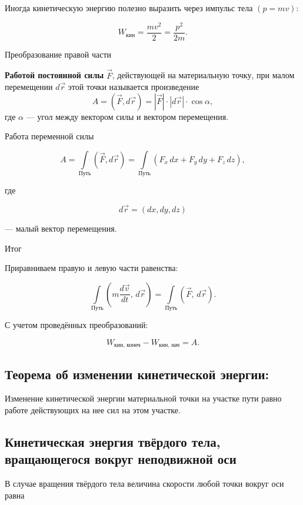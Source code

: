 \documentclass[a4paper,12pt]{article}
\begin{document}
Иногда кинетическую энергию полезно выразить через импульс тела $(p = mv)$:

\[
W_{\text{кин}}
=
\frac{mv^2}{2}
=
\frac{p^2}{2m}.
\]

Преобразование правой части

\begin{definitionbox}
\textbf{Работой постоянной силы} $\vec F$, действующей на материальную точку, при малом перемещении $d\vec r$ этой точки называется произведение
\[
A
=
(\vec F, d\vec r)
=
|\vec F| \cdot |d\vec r| \cdot \cos \alpha,
\]
где $\alpha$ — угол между вектором силы и вектором перемещения.
\end{definitionbox}

Работа переменной силы

\[
A
=
\int\limits_{\text{Путь}}
(\vec F, d\vec r)
=
\int\limits_{\text{Путь}}
(F_x \, dx + F_y \, dy + F_z \, dz),
\]

где

\[
d\vec r = (dx,dy,dz)
\]

— малый вектор перемещения.

Итог

Приравниваем правую и левую части равенства:

\[
\int\limits_{\text{Путь}}
\left(
m \frac{d\vec v}{dt},\, d\vec r
\right)
=
\int\limits_{\text{Путь}}
\left(
\vec F,\, d\vec r
\right).
\]

С учетом проведённых преобразований:

\[
W_{\text{кин, конеч}} - W_{\text{кин, нач}} = A.
\]

\begin{theorembox}
\subsection*{Теорема об изменении кинетической энергии:}

Изменение кинетической энергии материальной точки на участке пути равно работе действующих на нее сил на этом участке.
\end{theorembox}

\vspace{0.8em}

\subsection*{Кинетическая энергия твёрдого тела, вращающегося вокруг неподвижной оси}

В случае вращения твёрдого тела величина скорости любой точки вокруг оси равна
\end{document}
